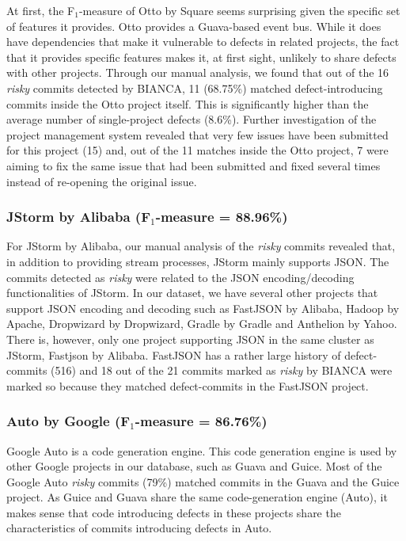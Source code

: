 \documentclass[12pt]{report}
\begin{document}
At first, the F\(_1\)-measure of Otto by Square seems surprising given
the specific set of features it provides. Otto provides a Guava-based
event bus. While it does have dependencies that make it vulnerable to
defects in related projects, the fact that it provides specific features
makes it, at first sight, unlikely to share defects with other projects.
Through our manual analysis, we found that out of the 16 \emph{risky}
commits detected by BIANCA, 11 (68.75\%) matched defect-introducing
commits inside the Otto project itself. This is significantly higher
than the average number of single-project defects (8.6\%). Further
investigation of the project management system revealed that very few
issues have been submitted for this project (15) and, out of the 11
matches inside the Otto project, 7 were aiming to fix the same issue
that had been submitted and fixed several times instead of re-opening
the original issue.

\subsubsection{\texorpdfstring{JStorm by Alibaba (F\(_1\)-measure =
88.96\%)}{JStorm by Alibaba (F\_1-measure = 88.96\%)}}\label{jstorm-by-alibaba-fux5f1-measure-88.96}

For JStorm by Alibaba, our manual analysis of the \emph{risky} commits
revealed that, in addition to providing stream processes, JStorm mainly
supports JSON. The commits detected as \emph{risky} were related to the
JSON encoding/decoding functionalities of JStorm. In our dataset, we
have several other projects that support JSON encoding and decoding such
as FastJSON by Alibaba, Hadoop by Apache, Dropwizard by Dropwizard,
Gradle by Gradle and Anthelion by Yahoo. There is, however, only one
project supporting JSON in the same cluster as JStorm, Fastjson by
Alibaba. FastJSON has a rather large history of defect-commits (516) and
18 out of the 21 commits marked as \emph{risky} by BIANCA were marked so
because they matched defect-commits in the FastJSON project.

\subsubsection{\texorpdfstring{Auto by Google (F\(_1\)-measure =
86.76\%)}{Auto by Google (F\_1-measure = 86.76\%)}}\label{auto-by-google-fux5f1-measure-86.76}

Google Auto is a code generation engine. This code generation engine is
used by other Google projects in our database, such as Guava and Guice.
Most of the Google Auto \emph{risky} commits (79\%) matched commits in
the Guava and the Guice project. As Guice and Guava share the same
code-generation engine (Auto), it makes sense that code introducing
defects in these projects share the characteristics of commits
introducing defects in Auto.
\end{document}
